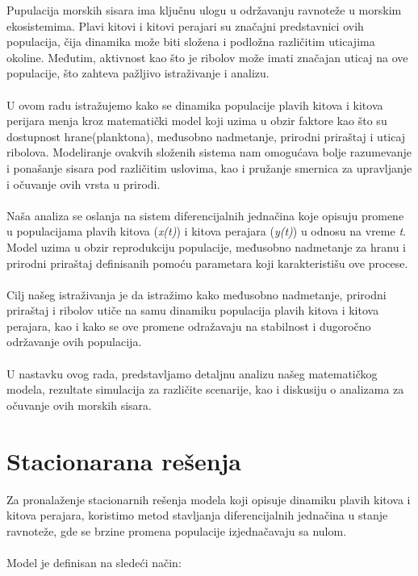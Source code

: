 \documentclass[a4paper]{article}
\begin{document}
{	Pupulacija morskih sisara ima ključnu ulogu u održavanju ravnoteže u morskim ekosistemima. Plavi kitovi i kitovi perajari su značajni predstavnici ovih populacija, čija dinamika može biti složena i podložna različitim uticajima okoline. Međutim, aktivnost kao što je ribolov može imati značajan uticaj na ove populacije, što zahteva pažljivo istraživanje i analizu. \\
	\\
	U ovom radu istražujemo kako se dinamika populacije plavih kitova i kitova perijara menja kroz matematički model koji uzima u obzir faktore kao što su dostupnost hrane(planktona), međusobno nadmetanje, prirodni priraštaj i uticaj ribolova. Modeliranje ovakvih složenih sistema nam omogućava bolje razumevanje i ponašanje sisara pod različitim uslovima, kao i pružanje smernica za upravljanje i očuvanje ovih vrsta u prirodi.  \\ 
	\\
	Naša analiza se oslanja na sistem diferencijalnih jednačina koje opisuju promene u populacijama plavih kitova (\textit{x(t)}) i kitova perajara (\textit{y(t)}) u odnosu na vreme \textit{t}. Model uzima u obzir reprodukciju populacije, međusobno nadmetanje za hranu i prirodni priraštaj definisanih pomoću parametara koji karakteristišu ove procese. \\
	\\
	Cilj našeg istraživanja je da istražimo kako međusobno nadmetanje, prirodni priraštaj i ribolov utiče na samu dinamiku populacija plavih kitova i kitova perajara, kao i kako se ove promene odražavaju na stabilnost i dugoročno održavanje ovih populacija. \\ 
	\\ 
	U nastavku ovog rada, predstavljamo detaljnu analizu našeg matematičkog modela, rezultate simulacija za različite scenarije, kao i diskusiju o analizama za očuvanje ovih morskih sisara.
	
	\section{Stacionarana rešenja}
	
	Za pronalaženje stacionarnih rešenja modela koji opisuje dinamiku plavih kitova i kitova perajara, koristimo metod stavljanja diferencijalnih jednačina u stanje ravnoteže, gde se brzine promena populacije izjednačavaju sa nulom. \\ 
	\\ 
	Model je definisan na sledeći način:
	
}
\end{document}
